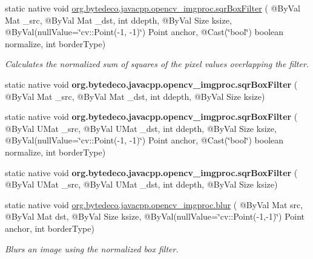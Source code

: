 \begin{DoxyCompactItemize}
\item 
static native void \hyperlink{group__imgproc__filter_gac3bb5f90c81da13be223978755c103e2}{org.\+bytedeco.\+javacpp.\+opencv\+\_\+imgproc.\+sqr\+Box\+Filter} ( @By\+Val Mat \+\_\+src, @By\+Val Mat \+\_\+dst, int ddepth, @By\+Val Size ksize, @By\+Val(null\+Value=\char`\"{}cv\+::\+Point(-\/1, -\/1)\char`\"{}) Point anchor, @Cast(\char`\"{}bool\char`\"{}) boolean normalize, int border\+Type)
\begin{DoxyCompactList}\small\item\em Calculates the normalized sum of squares of the pixel values overlapping the filter. \end{DoxyCompactList}\item 
\mbox{\label{group__imgproc__filter_gac69e2c5aa5aa8e1b1bf2ded1097813f1}} 
static native void {\bfseries org.\+bytedeco.\+javacpp.\+opencv\+\_\+imgproc.\+sqr\+Box\+Filter} ( @By\+Val Mat \+\_\+src, @By\+Val Mat \+\_\+dst, int ddepth, @By\+Val Size ksize)
\item 
\mbox{\label{group__imgproc__filter_gae438b3dd3418a0a16ebe6ccab65f8260}} 
static native void {\bfseries org.\+bytedeco.\+javacpp.\+opencv\+\_\+imgproc.\+sqr\+Box\+Filter} ( @By\+Val U\+Mat \+\_\+src, @By\+Val U\+Mat \+\_\+dst, int ddepth, @By\+Val Size ksize, @By\+Val(null\+Value=\char`\"{}cv\+::\+Point(-\/1, -\/1)\char`\"{}) Point anchor, @Cast(\char`\"{}bool\char`\"{}) boolean normalize, int border\+Type)
\item 
\mbox{\label{group__imgproc__filter_gae60998a04ea1d80b4998496348eb7dda}} 
static native void {\bfseries org.\+bytedeco.\+javacpp.\+opencv\+\_\+imgproc.\+sqr\+Box\+Filter} ( @By\+Val U\+Mat \+\_\+src, @By\+Val U\+Mat \+\_\+dst, int ddepth, @By\+Val Size ksize)
\item 
static native void \hyperlink{group__imgproc__filter_ga2878e087c0294ad9e5f1996c07b303b4}{org.\+bytedeco.\+javacpp.\+opencv\+\_\+imgproc.\+blur} ( @By\+Val Mat src, @By\+Val Mat dst, @By\+Val Size ksize, @By\+Val(null\+Value=\char`\"{}cv\+::\+Point(-\/1,-\/1)\char`\"{}) Point anchor, int border\+Type)
\begin{DoxyCompactList}\small\item\em Blurs an image using the normalized box filter. \end{DoxyCompactList}\item 

\end{DoxyCompactItemize}

